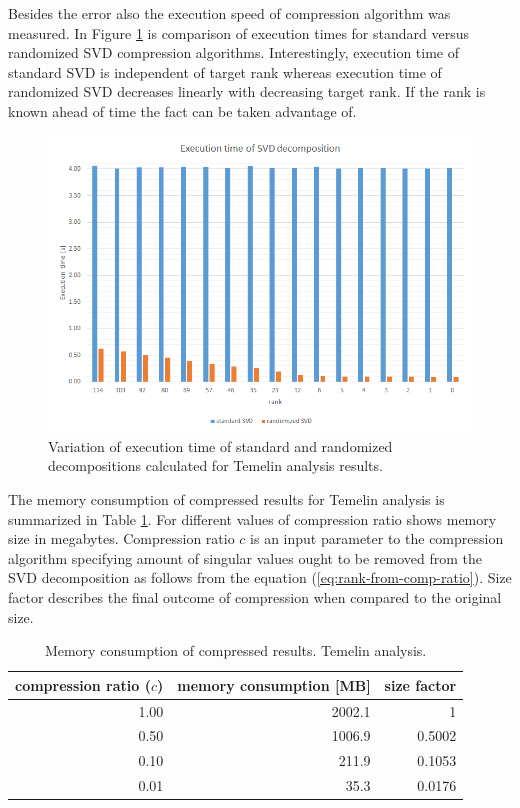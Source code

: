 Besides the error also the execution speed of compression algorithm was measured. In Figure \ref{fig:temelin:ExeTime} is comparison of execution times for standard versus randomized SVD compression algorithms. Interestingly, execution time of standard SVD is independent of target rank whereas execution time of randomized SVD decreases linearly with decreasing target rank. If the rank is known ahead of time the fact can be taken advantage of.

\begin{figure}[H]
\centering\includegraphics[width=\textwidth]{figures/temelin_ExecutionTime}
\caption{Variation of execution time of standard and randomized decompositions calculated for Temelin analysis results.}
\label{fig:temelin:ExeTime}
\end{figure}

The memory consumption of compressed results for Temelin analysis is summarized in Table \ref{tab:mem-consum}. For different values of compression ratio shows memory size in megabytes. Compression ratio $c$ is an input parameter to the compression algorithm specifying amount of singular values ought to be removed from the SVD decomposition as follows from the equation (\ref{eq:rank-from-comp-ratio}). Size factor describes the final outcome of compression when compared to the original size.

\begin{table}[H]
\centering
    \begin{tabular}{| r | r | r |}
    \hline
    compression ratio ($c$) & memory consumption [MB] & size factor \\ \hline \hline
    1.00 & 2002.1 & 1 \\ \hline
    0.50 & 1006.9 & 0.5002 \\ \hline
    0.10& 211.9 & 0.1053 \\ \hline
    0.01 & 35.3 & 0.0176 \\ \hline
    \end{tabular}
    \caption{Memory consumption of compressed results. Temelin analysis.}
	\label{tab:mem-consum}
\end{table}
